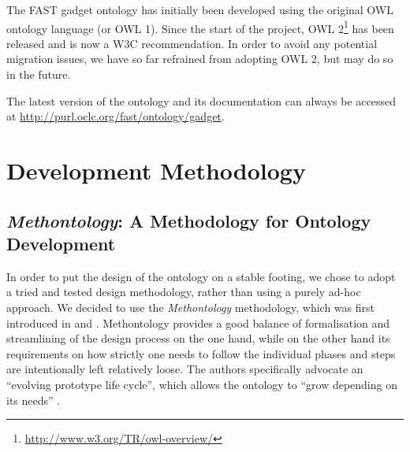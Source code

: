 \documentclass[twoside]{fast_latex}
\begin{document}
The FAST gadget ontology has initially been developed using the original OWL ontology language (or OWL 1). Since the start of the project, OWL 2\footnote{\url{http://www.w3.org/TR/owl-overview/}} has been released and is now a W3C recommendation. In order to avoid any potential migration issues, we have so far refrained from adopting OWL 2, but may do so in the future.

The latest version of the ontology and its documentation can always be accessed at \url{http://purl.oclc.org/fast/ontology/gadget}.


% 

\clearpage
{}
\appendix

\section{Development Methodology}
\label{sec:methodology}

\subsection{\emph{Methontology}: A Methodology for Ontology Development} %
\label{sub:methontology_a_methodology_for_ontology_development}

In order to put the design of the ontology on a stable footing, we chose to adopt a tried and tested design methodology, rather than using a purely ad-hoc approach. We decided to use the \emph{Methontology} methodology, which was first introduced in \cite{gomez_perez1996conceptualise_ontologies} and \cite{fernandez1997methontology}. Methontology provides a good balance of formalisation and streamlining of the design process on the one hand, while on the other hand its requirements on how strictly one needs to follow the individual phases and steps are intentionally left relatively loose.
The authors specifically advocate an ``evolving prototype life cycle'', which allows the ontology to ``grow depending on its needs'' \cite{fernandez1997methontology}.
\end{document}
